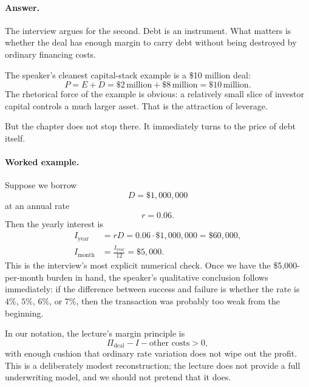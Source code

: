 \paragraph{Answer.} The interview argues for the second. Debt is an instrument. What matters is whether the deal has enough margin to carry debt without being destroyed by ordinary financing costs.

The speaker's cleanest capital-stack example is a \$10 million deal:
\begin{equation}
P = E + D = \$2\,\text{million} + \$8\,\text{million} = \$10\,\text{million}.
\end{equation}
The rhetorical force of the example is obvious: a relatively small slice of investor capital controls a much larger asset. That is the attraction of leverage.

But the chapter does not stop there. It immediately turns to the price of debt itself.

\paragraph{Worked example.} Suppose we borrow
\begin{equation}
D = \$1{,}000{,}000
\end{equation}
at an annual rate
\begin{equation}
r = 0.06.
\end{equation}
Then the yearly interest is
\begin{align}
I_{\text{year}} &= rD = 0.06\cdot \$1{,}000{,}000 = \$60{,}000,\\
I_{\text{month}} &= \frac{I_{\text{year}}}{12} = \$5{,}000.
\end{align}
This is the interview's most explicit numerical check. Once we have the \$5,000-per-month burden in hand, the speaker's qualitative conclusion follows immediately: if the difference between success and failure is whether the rate is $4\%$, $5\%$, $6\%$, or $7\%$, then the transaction was probably too weak from the beginning.

In our notation, the lecture's margin principle is
\begin{equation}
\Pi_{\text{deal}} - I - \text{other costs} > 0,
\end{equation}
with enough cushion that ordinary rate variation does not wipe out the profit. This is a deliberately modest reconstruction; the lecture does not provide a full underwriting model, and we should not pretend that it does.

